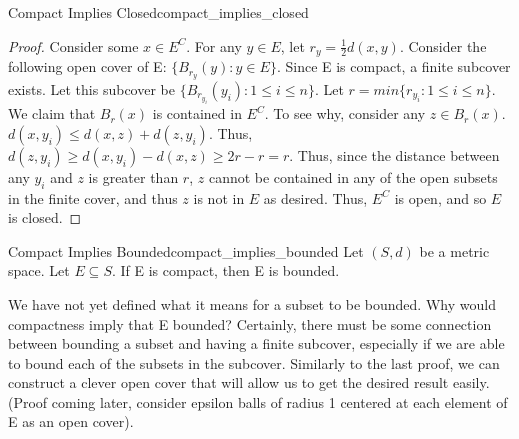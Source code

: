 \begin{thm}{Compact Implies Closed}{compact_implies_closed}
\begin{proof}
Consider some \(x \in E^C\). For any \(y \in E\), let \(r_y = \frac{1}{2} d(x,y)\). Consider the following open cover of E: \(\{B_{r_y}(y) : y \in E\}\). Since E is compact, a finite subcover exists. Let this subcover be \(\{B_{r_{y_i}}(y_i) : 1 \leq i \leq n \}\). Let \(r = min \{ r_{y_{i}} : 1 \leq i \leq n \} \). We claim that \(B_r(x)\) is contained in \(E^C\). To see why, consider any \(z \in B_r(x)\). \(d(x, y_i) \leq d(x, z) + d(z, y_i)\). Thus, \(d(z, y_i) \geq d(x, y_i) - d(x,z) \geq 2r - r = r\). Thus, since the distance between any \(y_i\) and \(z\) is greater than \(r\), \(z\) cannot be contained in any of the open subsets in the finite cover, and thus \(z\) is not in \(E\) as desired. Thus, \(E^C\) is open, and so \(E\) is closed. 
\end{proof}
\end{thm}

\begin{thm}{Compact Implies Bounded}{compact_implies_bounded}
Let \((S, d)\) be a metric space. Let \(E \subseteq S\). \newline 
If E is compact, then E is bounded. \newline 

We have not yet defined what it means for a subset to be bounded. %
Why would compactness imply that E bounded? Certainly, there must be some connection between bounding a subset and having a finite subcover, especially if we are able to bound each of the subsets in the subcover. Similarly to the last proof, we can construct a clever open cover that will allow us to get the desired result easily. (Proof coming later, consider epsilon balls of radius 1 centered at each element of E as an open cover).

\end{thm}

